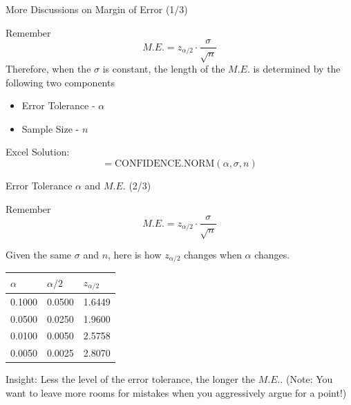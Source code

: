 \documentclass{beamer}
\begin{document}
\begin{frame}{More Discussions on Margin of Error (1/3)}

Remember 
$$ M.E. = z_{\alpha/2} \cdot \frac{\sigma}{\sqrt{n}} $$
Therefore, when the $\sigma$ is constant, the length of the $M.E.$ is determined by the following two components 
\begin{itemize}
\item Error Tolerance - $\alpha$
\item Sample Size - $n$
\end{itemize}

\vspace{0.3 cm}
Excel Solution: 
$$ =\text{CONFIDENCE.NORM}(\alpha, \sigma, n)$$

\end{frame}



\begin{frame}{Error Tolerance $\alpha$ and $M.E.$ (2/3)}

Remember 
$$ M.E. = z_{\alpha/2} \cdot \frac{\sigma}{\sqrt{n}} $$

Given the same $\sigma$ and $n$, here is how $z_{\alpha/2}$ changes when $\alpha$ changes.

\begin{center}
\begin{tabular}{l|l|l}
\hline
$\alpha$ & $\alpha/2$ & $z_{\alpha/2}$ \\ \hline
0.1000   & 0.0500     & 1.6449         \\ \hline
0.0500   & 0.0250     & 1.9600         \\ \hline
0.0100   & 0.0050     & 2.5758         \\ \hline
0.0050   & 0.0025     & 2.8070         \\ \hline
\end{tabular}
\end{center}

Insight: Less the level of the error tolerance, the longer the $M.E.$.
(Note: You want to leave more rooms for mistakes when you aggressively argue for a point!)

\end{frame}
\end{document}
